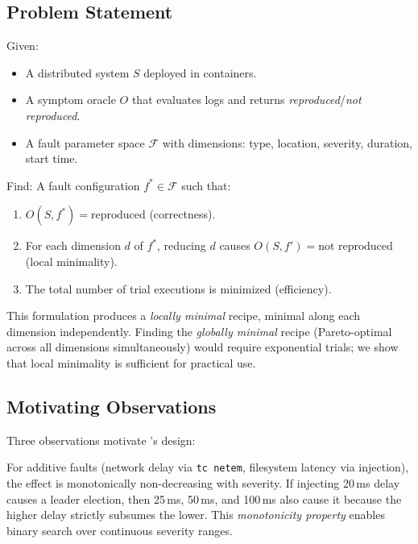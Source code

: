 \subsection{Problem Statement}
\label{sec:problem}

Given:
\begin{itemize}[leftmargin=*,topsep=2pt,itemsep=1pt]
  \item A distributed system $S$ deployed in containers.
  \item A symptom oracle $O$ that evaluates logs and returns
        \emph{reproduced}/\emph{not reproduced}.
  \item A fault parameter space $\mathcal{F}$ with dimensions: type, location,
        severity, duration, start time.
\end{itemize}

Find: A fault configuration $f^* \in \mathcal{F}$ such that:
\begin{enumerate}[leftmargin=*,topsep=2pt,itemsep=1pt]
  \item $O(S, f^*) = \text{reproduced}$ (correctness).
  \item For each dimension $d$ of $f^*$, reducing $d$ causes
        $O(S, f') = \text{not reproduced}$ (local minimality).
  \item The total number of trial executions is minimized (efficiency).
\end{enumerate}

\noindent This formulation produces a \emph{locally minimal} recipe, minimal
along each dimension independently. Finding the \emph{globally minimal} recipe
(Pareto-optimal across all dimensions simultaneously) would require exponential
trials; we show that local minimality is sufficient for practical use.

\subsection{Motivating Observations}

Three observations motivate \system{}'s design:

 For additive faults (network
delay via \texttt{tc netem}, filesystem latency via injection), the effect is
monotonically non-decreasing with severity. If injecting 20\,ms delay causes
a leader election, then 25\,ms, 50\,ms, and 100\,ms also cause it because the
higher delay strictly subsumes the lower. This \emph{monotonicity property} enables
binary search over continuous severity ranges.

